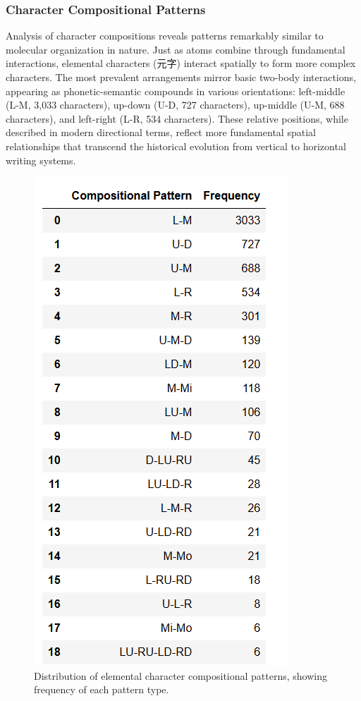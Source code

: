 \subsubsection{Character Compositional
Patterns}\label{character-compositional-patterns}

Analysis of character compositions reveals patterns remarkably similar
to molecular organization in nature. Just as atoms combine through
fundamental interactions, elemental characters (元字) interact spatially
to form more complex characters. The most prevalent arrangements mirror
basic two-body interactions, appearing as phonetic-semantic compounds in
various orientations: left-middle (L-M, 3,033 characters), up-down (U-D,
727 characters), up-middle (U-M, 688 characters), and left-right (L-R,
534 characters). These relative positions, while described in modern
directional terms, reflect more fundamental spatial relationships that
transcend the historical evolution from vertical to horizontal writing
systems.

\begin{figure}
\centering
\includegraphics{./images/app_compositional_pattern.png}
\caption{Distribution of elemental character compositional patterns,
showing frequency of each pattern type.}
\end{figure}

